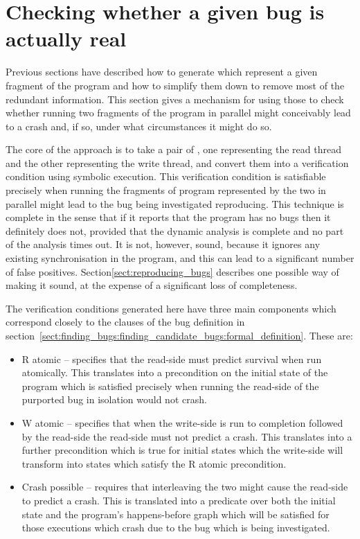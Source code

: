\section{Checking whether a given bug is actually real}
\label{sect:using:check_realness}

Previous sections have described how to generate {\StateMachines}
which represent a given fragment of the program and how to simplify
them down to remove most of the redundant information.  This section
gives a mechanism for using those {\StateMachines} to check whether
running two fragments of the program in parallel might conceivably
lead to a crash and, if so, under what circumstances it might do so.

The core of the approach is to take a pair of {\StateMachines}, one
representing the read thread and the other representing the write
thread, and convert them into a verification condition using symbolic
execution.  This verification condition is satisfiable precisely when
running the fragments of program represented by the two
{\StateMachines} in parallel might lead to the bug being investigated
reproducing.  This technique is complete in the sense that if it
reports that the program has no bugs then it definitely does not,
provided that the dynamic analysis is complete and no part of the
analysis times out.  It is not, however, sound, because it ignores any
existing synchronisation in the program, and this can lead to a
significant number of false positives.
Section\ref{sect:reproducing_bugs} describes one possible way of
making it sound, at the expense of a significant loss of completeness.

The verification conditions generated here have three main components
which correspond closely to the clauses of the bug definition in
section~\ref{sect:finding_bugs:finding_candidate_bugs:formal_definition}.
These are:

\begin{itemize}
\item
  R atomic -- specifies that the read-side {\StateMachine} must
  predict survival when run atomically.  This translates into a
  precondition on the initial state of the program which is satisfied
  precisely when running the read-side of the purported bug in
  isolation would not crash.
\item
  W atomic -- specifies that when the write-side {\StateMachine} is
  run to completion followed by the read-side {\StateMachine} the
  read-side {\StateMachine} must not predict a crash.  This translates
  into a further precondition which is true for initial states which
  the write-side {\StateMachine} will transform into states which
  satisfy the R atomic precondition.
\item
  Crash possible -- requires that interleaving the two
  {\StateMachines} might cause the read-side {\StateMachine} to
  predict a crash.  This is translated into a predicate over both the
  initial state and the program's happens-before graph which will be
  satisfied for those executions which crash due to the bug which is
  being investigated.
\end{itemize}

